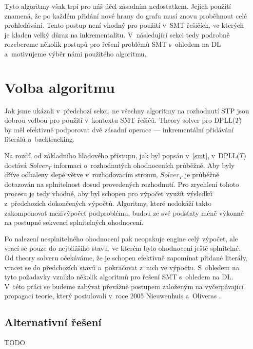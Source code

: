 Tyto algoritmy však trpí pro náš účel zásadním nedostatkem. Jejich použití znamená, že po každém přidání nové hrany do grafu musí znovu proběhnout celé prohledávání. Tento postup není vhodný pro použití v~SMT řešičích, ve kterých je kladen velký důraz na inkrementalitu. V~následující sekci tedy podrobně rozebereme několik postupů pro řešení problémů SMT s~ohledem na DL a~motivujeme výběr námi použitého algoritmu. 

\section{Volba algoritmu}\label{alg}

Jak jsme ukázali v~předchozí sekci, ne všechny algoritmy na rozhodnutí STP jsou dobrou volbou pro použití v~kontextu SMT řešičů. Theory solver pro DPLL($T$) by měl efektivně podporovat dvě zásadní operace --- inkrementální přidávání literálů a~backtracking.

Na rozdíl od základního hladového přístupu, jak byl popsán v~\ref{smt}, v~DPLL($T$) dostává $Solver_T$ informaci o~rozhodnutých ohodnoceních průběžně. Aby byly dříve odhaleny slepé větve v~rozhodovacím stromu, $Solver_T$ je průběžně dotazován na splnitelnost dosud provedených rozhodnutí. Pro zrychlení tohoto procesu je tedy vhodné, aby byl schopen pro výpočet využít výsledků z~předchozích dokončených výpočtů. Algoritmy, které nedokáží takto zakomponovat mezivýpočet podproblému, budou ze své podstaty méně výkonné na postupné sekvenci splnitelných ohodnocení.

Po nalezení nesplnitelného ohodnocení pak neopakuje engine celý výpočet, ale vrací se pouze do nejbližšího stavu, ve kterém bylo ohodnocení ještě splnitelné. Od theory solveru očekáváme, že je schopen efektivně zapomínat přidané literály, vracet se do předchozích stavů a~pokračovat z~nich ve výpočtu. %
S~ohledem na tyto požadavky vzniklo několik algoritmů pro řešení SMT s~ohledem na DL. V~této práci se budeme zabývat převážně postupem založeným na vyčerpávající propagaci teorie, který postulovali v~roce 2005 Nieuwenhuis a~Oliveras \cite{Nieuwenhuis05}.

\subsection{Alternativní řešení}

TODO

